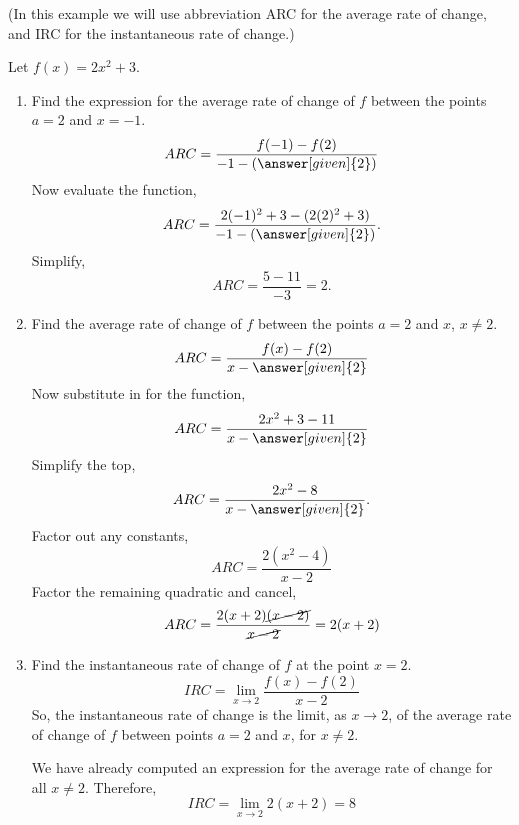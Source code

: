 \documentclass{ximera}
\begin{document}
\begin{image}
\end{image}


\begin{example}
(In this example we will use abbreviation ARC for the average rate of change,  and IRC for the instantaneous rate of change.)

Let $f(x)=2x^2+3$.
\begin{enumerate}
\item Find the expression for the average rate of change of $f$ between the points  $a=2$ and $x=-1$.
\[
ARC=\frac{f(-1)-f(2)}{-1-\left(\answer[given]{2}\right)}
\]
  Now evaluate the function,
  \[
ARC=\frac{2(-1)^2+3-(2(2)^2+3)}{-1-\left(\answer[given]{2}\right)}.
\]
Simplify,
 \[
ARC=\frac{5-11}{-3}=2.
\]
\item Find  the average rate of change of $f$ between the points $a=2$ and $x$, $x\ne 2$.
\[
ARC=\frac{f(x)-f(2)}{x-\answer[given]{2}}
\]
 Now substitute in for the function,
\[
ARC=\frac{2x^2+3-11}{x-\answer[given]{2}}
\]
Simplify the top,
\[
ARC=\frac{2x^2-8}{x-\answer[given]{2}}.
\]
Factor out any constants,
\[
ARC=\frac{2(x^2-4)}{x-2}
\]
Factor the remaining quadratic and cancel,
\[
ARC=\frac{2(x+2)\cancel{(x-2)}}{\cancel{x-2}}=2(x+2)
\]


\item Find the instantaneous rate of change of $f$ at the point $x=2$.
\[
IRC= \lim_{x\to 2} \frac{f(x)-f(2)}{x-2}
\]
So, the instantaneous rate of change is the limit, as $x\to 2$, of the average rate of change of $f$ between points $a=2$ and $x$, for $x\ne2$. 

We have already computed an expression for the average rate of change for all $x\ne2$. 
Therefore,
\[
IRC=\lim_{x\to 2}2(x+2)=8
\]
\end{enumerate}

\end{example}
\end{document}
